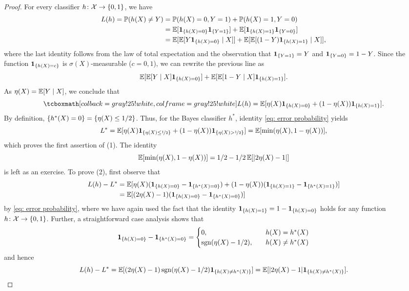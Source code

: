 \begin{proof}
For every classifier $h \colon \mathcal{X} \to \set{0, 1}$, we have
\begin{align*}
    L(h) = \P(h(X) \neq Y) &= \P(h(X) = 0, Y = 1) + \P(h(X) = 1, Y = 0) \\
    &= \Exp[\indSet{h(X) = 0} \indSet{Y = 1}] + \Exp[\indSet{h(X) = 1} \indSet{Y = 0}] \\
    &= \Exp[\Exp[Y \indSet{h(X) = 0} \given X]] + \Exp[\Exp[(1 - Y) \indSet{h(X) = 1} \given X]],
\end{align*}
where the last identity follows from the law of total expectation and the observation that $\indSet{Y = 1} = Y$ and $\indSet{Y = 0} = 1 - Y$. Since the function $\indSet{h(X) = c}$ is $\sigma(X)$-measurable ($c = 0, 1$), we can rewrite the previous line as
\[
    \Exp[\Exp[Y \given X] \indSet{h(X) = 0}] + \Exp[\Exp[1 - Y \given X] \indSet{h(X) = 1}].
\]
As $\eta(X) = \operatorname{\mathbb{E}}[Y \mathrel{|} X]$, we conclude that
\begin{equation}
    \label{eq: error probability}
    \highlightMath{
        L(h) = \Exp[\eta(X) \indSet{h(X) = 0} + (1 - \eta(X)) \indSet{h(X) = 1}].
    }
\end{equation}
By definition, $\set{h^*(X) = 0} = \set{\eta(X) \leq 1/2}$. Thus, for the Bayes classifier $h^*$, identity \eqref{eq: error probability} yields
\[
    L^* = \Exp[\eta(X) \indSet{\eta(X) \leq \nicefrac{1}{2}} + (1 - \eta(X)) \indSet{\eta(X) > \nicefrac{1}{2}}] = \Exp[\min(\eta(X), 1 - \eta(X))],
\]
which proves the first assertion of (1). The identity
\[
    \operatorname{\mathbb{E}}[\min(\eta(X), 1 - \eta(X))] = 1/2 - 1/2 \operatorname{\mathbb{E}}[\abs{2\eta(X) - 1 }]
\]
is left as an exercise. To prove (2), first observe that
\begin{align*}
    L(h) - L^* &= \Exp[\eta(X) (\indSet{h(X) = 0} - \indSet{h^*(X) = 0}) + (1 - \eta(X)) (\indSet{h(X) = 1} - \indSet{h^*(X) = 1})] \\
    &= \Exp[(2\eta(X) - 1) (\indSet{h(X) = 0} - \indSet{h^*(X) = 0})]
\end{align*}
by \eqref{eq: error probability}, where we have again used the fact that the identity $\indSet{h(X) = 1} = 1 - \indSet{h(X) = 0}$ holds for any function $h \colon \mathcal{X} \to \set{0, 1}$. Further, a straightforward case analysis shows that
\[
    \indSet{h(X) = 0} - \indSet{h^*(X) = 0} = \begin{cases}
        0, \quad & h(X) = h^*(X) \\
        \sgn(\eta(X) - 1/2), \quad & h(X) \neq h^*(X)
    \end{cases}
\]
and hence
\[
    L(h) - L^* = \Exp[(2\eta(X) - 1) \sgn(\eta(X) - 1/2) \indSet{h(X) \neq h^*(X)}] = \Exp[\abs{2\eta(X) - 1} \indSet{h(X) \neq h^*(X)}]. \qedhere
\]
\end{proof}

